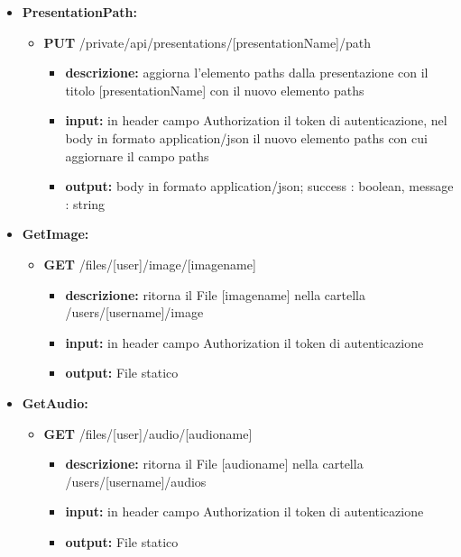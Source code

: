 {{\begin{itemize}
		\item \textbf{PresentationPath:}
			\begin{itemize}
			\item   \textbf{PUT} /private/api/presentations/[presentationName]/path
				\begin{itemize} 
				\item \textbf{descrizione:} aggiorna l'elemento paths dalla presentazione con il titolo [presentationName]  con il nuovo elemento paths
				\item \textbf{input:} in header campo Authorization il token di autenticazione, nel body in formato application/json il nuovo elemento paths con cui aggiornare il campo paths
				\item \textbf{output:} body in formato application/json; success : boolean, message : string
				\end{itemize}
			\end{itemize}
			
			
		\item \textbf{GetImage:}
			\begin{itemize}
			\item    \textbf{GET} /files/[user]/image/[imagename]
				\begin{itemize} 
				\item \textbf{descrizione:} ritorna il File nella cartella /users/[username]/image
				\item \textbf{input:} in header campo Authorization il token di autenticazione
				\item \textbf{output:} File statico
				\end{itemize}
			\end{itemize}
			
		\item \textbf{GetAudio:}
			\begin{itemize}
			\item    \textbf{GET} /files/[user]/audio/[audioname]
				\begin{itemize} 
				\item \textbf{descrizione:} ritorna il File nella cartella /users/[username]/audios
				\item \textbf{input:} in header campo Authorization il token di autenticazione
				\item \textbf{output:} File statico
				\end{itemize}		
			\end{itemize}
			

\end{itemize}}}
